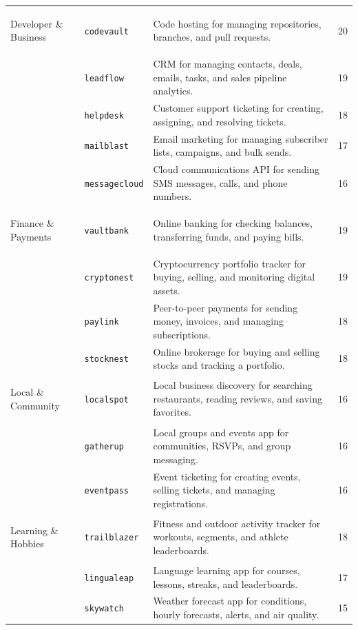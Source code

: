 \documentclass[11pt]{article}
\newcommand{\app}[1]{\texttt{#1}}
\begin{document}
{\begin{longtable}{@{}>{\bfseries\raggedright\arraybackslash}p{2.65cm} >{\raggedright\arraybackslash}p{2.55cm} >{\raggedright\arraybackslash}p{8.30cm} r@{}}
Developer \& Business
  & \app{codevault}    & Code hosting for managing repositories, branches, and pull requests.                    & 20 \\
  & \app{leadflow}     & CRM for managing contacts, deals, emails, tasks, and sales pipeline analytics.          & 19 \\
  & \app{helpdesk}     & Customer support ticketing for creating, assigning, and resolving tickets.              & 18 \\
  & \app{mailblast}    & Email marketing for managing subscriber lists, campaigns, and bulk sends.               & 17 \\
  & \app{messagecloud} & Cloud communications API for sending SMS messages, calls, and phone numbers.           & 16 \\
\midrule

Finance \& Payments
  & \app{vaultbank}  & Online banking for checking balances, transferring funds, and paying bills.               & 19 \\
  & \app{cryptonest} & Cryptocurrency portfolio tracker for buying, selling, and monitoring digital assets.      & 19 \\
  & \app{paylink}    & Peer-to-peer payments for sending money, invoices, and managing subscriptions.            & 18 \\
  & \app{stocknest}  & Online brokerage for buying and selling stocks and tracking a portfolio.                  & 18 \\
\midrule

Local \& Community
  & \app{localspot} & Local business discovery for searching restaurants, reading reviews, and saving favorites. & 16 \\
  & \app{gatherup}  & Local groups and events app for communities, RSVPs, and group messaging.                  & 16 \\
  & \app{eventpass} & Event ticketing for creating events, selling tickets, and managing registrations.         & 16 \\
\midrule

Learning \& Hobbies
  & \app{trailblazer} & Fitness and outdoor activity tracker for workouts, segments, and athlete leaderboards.  & 18 \\
  & \app{lingualeap}  & Language learning app for courses, lessons, streaks, and leaderboards.                   & 17 \\
  & \app{skywatch}    & Weather forecast app for conditions, hourly forecasts, alerts, and air quality.           & 15 \\

\end{longtable}
}
\end{document}
